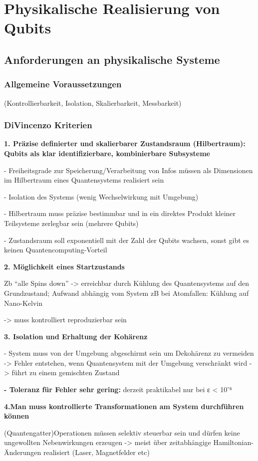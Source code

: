 \section{Physikalische Realisierung von Qubits }
\subsection{Anforderungen an physikalische Systeme }
\subsubsection{Allgemeine Voraussetzungen}
(Kontrollierbarkeit, Isolation, Skalierbarkeit, Messbarkeit) 
\subsubsection{DiVincenzo Kriterien}
\textbf{1. Präzise definierter und skalierbarer Zustandsraum (Hilbertraum): Qubits als klar identifizierbare, kombinierbare Subsysteme} 

- Freiheitsgrade zur Speicherung/Verarbeitung von Infos müssen als Dimensionen im Hilbertraum eines Quantensystems realisiert sein 

- Isolation des Systems (wenig Wechselwirkung mit Umgebung) 

- Hilbertraum muss präzise bestimmbar und in ein direktes Produkt kleiner Teilsysteme zerlegbar sein (mehrere Qubits) 

- Zustandsraum soll exponentiell mit der Zahl der Qubits wachsen, sonst gibt es keinen Quantencomputing-Vorteil 

\textbf{{2. Möglichkeit eines Startzustands} }

Zb “alle Spins down” -> erreichbar durch Kühlung des Quantensystems auf den Grundzustand; Aufwand abhängig vom System zB bei Atomfallen: Kühlung auf Nano-Kelvin 

-> muss kontrolliert reproduzierbar sein 

\textbf{3. Isolation und Erhaltung der Kohärenz} 

- System muss von der Umgebung abgeschirmt sein um Dekohärenz zu vermeiden -> Fehler entstehen, wenn Quantensystem mit der Umgebung verschränkt wird -> führt zu einem gemischten Zustand 

\textbf{- Toleranz für Fehler sehr gering: }derzeit praktikabel nur bei ε < 10⁻⁶ 

\textbf{4.Man muss kontrollierte Transformationen am System durchführen können} 

(Quantengatter)Operationen müssen selektiv steuerbar sein und dürfen keine ungewollten Nebenwirkungen erzeugen -> meist über zeitabhängige Hamiltonian-Änderungen realisiert (Laser, Magnetfelder etc) 


